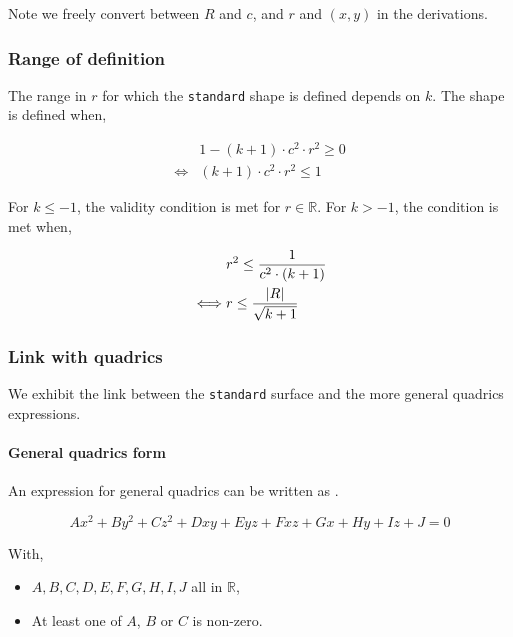 Note we freely convert between $R$ and $c$, and $r$ and $(x, y)$ in
the derivations.

\subsubsection{Range of definition}
The range in $r$ for which the \lstinline{standard} shape is defined
depends on $k$. The shape is defined when,

\begin{equation} \begin{split}
& 1 - (k+1) \cdot c^2 \cdot r^2 \geq 0 \\
\iff & (k+1) \cdot c^2 \cdot r^2 \leq 1
\end{split} \end{equation}

For $k \leq -1$, the validity condition is met for $r \in \mathbb{R}$.
For $k > -1$, the condition is met when,

\begin{equation} \begin{split}
& r^2 \leq \frac{1}{c^2 \cdot (k+1)} \\
\iff & r \leq \frac{\abs{R}}{\sqrt{k+1}}
\end{split} \end{equation}

\subsubsection{Link with quadrics}
We exhibit the link between the \lstinline{standard} surface and the
more general quadrics expressions.

\paragraph{General quadrics form}
An expression for general quadrics can be written as \cite{wiki:quadric}.

\begin{equation}
A x^2 + B y^2 + C z^2 + D x y + E y z + F x z + G x + H y + I z + J = 0
\end{equation}

With,
\begin{itemize}
\item $A, B, C, D, E, F, G, H, I, J$ all in $\mathbb{R}$,
\item At least one of $A$, $B$ or $C$ is non-zero.
\end{itemize}

